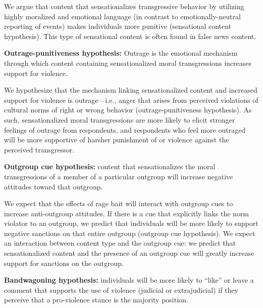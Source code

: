 We argue that content that sensationalizes transgressive behavior by utilizing highly moralized and emotional language (in contrast to emotionally-neutral reporting of events) makes individuals more punitive (sensational content hypothesis). This type of sensational content is often found in false news content. 

\vspace{1em}
\noindent\textbf{Outrage-punitiveness hypothesis:} Outrage is the emotional mechanism through which content containing sensationalized moral transgressions increases support for violence.
\vspace{1em}

We hypothesize that the mechanism linking sensationalized content and increased support for violence is outrage---i.e., anger that arises from perceived violations of cultural norms of right or wrong behavior \citep{crockett2017moral, stets2012current, turner2006sociological} (outrage-punitiveness hypothesis). As such, sensationalized moral transgressions are more likely to elicit stronger feelings of outrage from respondents, and respondents who feel more outraged will be more supportive of harsher punishment of or violence against the perceived transgressor.

\vspace{1em}
\noindent\textbf{Outgroup cue hypothesis:}  content that sensationalizes the moral transgressions of a member of a particular outgroup will increase negative attitudes toward that outgroup.
\vspace{1em}

We expect that the effects of rage bait will interact with outgroup cues to increase anti-outgroup attitudes. If there is a cue that explicitly links the norm violator to an outgroup, we predict that individuals will be more likely to support negative sanctions on that entire outgroup (outgroup cue hypothesis). We expect an interaction between content type and the outgroup cue: we predict that sensationalized content and the presence of an outgroup cue will greatly increase support for sanctions on the outgroup.

\vspace{1em}
\noindent\textbf{Bandwagoning hypothesis:} individuals will be more likely to ``like'' or leave a comment that supports the use of violence (judicial or extrajudicial) if they perceive that a pro-violence stance is the majority position.
\vspace{1em}

